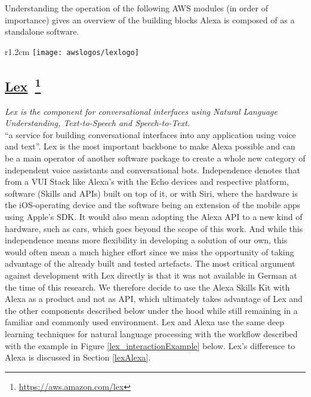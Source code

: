 Understanding the operation of the following AWS modules (in order of importance) gives an overview of the building blocks Alexa is composed of as a standalone software. %




%	
\begin{wrapfigure}[2]{r}{1.2cm}
	\texttt{[image: awslogos/lexlogo]}
\end{wrapfigure}
%


\subsection*{
	\href{https://aws.amazon.com/lex/}{\textbf{Lex}}~\footnote{\url{https://aws.amazon.com/lex}}
}
	\textit{Lex is the component for conversational interfaces using Natural Language Understanding, Text-to-Speech and Speech-to-Text.} \\
	``a service for building conversational interfaces into any application using voice and text''\cite{aws_website}.
	Lex is the most important backbone to make Alexa possible and can be a main operator of another software package to create a whole new category of independent voice assistants and conversational bots. Independence denotes that  from a VUI Stack like Alexa's with the Echo devices and respective platform, software (Skills and APIs) built on top of it, or with  Siri, where the hardware is the iOS-operating device and the software being an extension of the mobile apps using Apple's SDK. It would also mean adopting the Alexa API to a new kind of hardware, such as cars, which goes beyond the scope of this work. And while this independence means more flexibility in developing a solution of our own, this would often mean a much higher effort since we miss the opportunity of taking advantage of the already built and tested artefacts. The most critical argument against development with Lex directly is that it was not available in German at the time of this research. We therefore decide to use the Alexa Skills Kit with Alexa as a product and not as API, which ultimately takes advantage of Lex and the other components described below under the hood while still remaining in a familiar and commonly used environment. Lex and Alexa use the same deep learning techniques for natural language processing with the workflow described with the example in Figure \ref{lex_interactionExample} below. Lex's difference to Alexa  is discussed in Section \ref{lexAlexa}.


